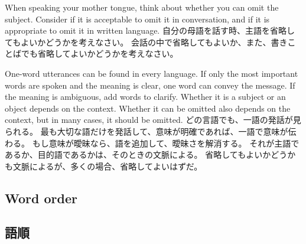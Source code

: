 \documentclass[uplatex,dvipdfmx,b5paper,english,10pt]{jsbook}
\begin{document}
\begin{toiquestion}
\ifEnglish
When speaking your mother tongue, think about whether you can omit the subject.
Consider if it is acceptable to omit it in conversation, and if it is appropriate to omit it in written language.
\else
自分の母語を話す時、主語を省略してもよいかどうかを考えなさい。
会話の中で省略してもよいか、また、書きことばでも省略してよいかどうかを考えなさい。
\fi
\end{toiquestion}

\begin{toianswer}
\ifEnglish
One-word utterances can be found in every language.
If only the most important words are spoken and the meaning is clear, one word can convey the message.
If the meaning is ambiguous, add words to clarify.
Whether it is a subject or an object depends on the context.
Whether it can be omitted also depends on the context, but in many cases, it should be omitted.
\else
どの言語でも、一語の発話が見られる。
最も大切な語だけを発話して、意味が明確であれば、一語で意味が伝わる。
もし意味が曖昧なら、語を追加して、曖昧さを解消する。
それが主語であるか、目的語であるかは、そのときの文脈による。
省略してもよいかどうかも文脈によるが、多くの場合、省略してよいはずだ。
\fi
\end{toianswer}

\ifEnglish
\subsection{Word order}
\else
\subsection{語順}
\fi
\end{document}
